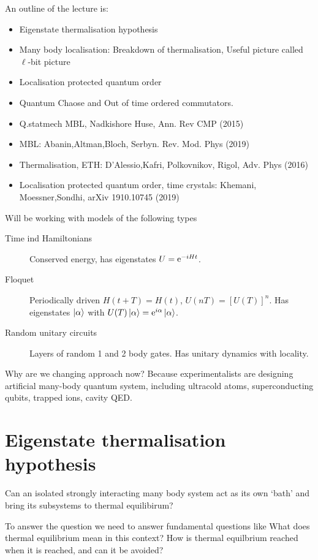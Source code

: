 \documentclass[a4paper]{article}
\begin{document}
An outline of the lecture is:
\begin{itemize}
    \item Eigenstate thermalisation hypothesis
    \item Many body localisation: Breakdown of thermalisation, Useful picture
        called $\ell$-bit picture
    \item Localisation protected quantum order
    \item Quantum Chaose and Out of time ordered commutators.
\end{itemize}
\begin{itemize}
    \item Q.statmech MBL, Nadkishore Huse, Ann. Rev CMP (2015)
    \item MBL: Abanin,Altman,Bloch, Serbyn. Rev. Mod. Phys (2019)
    \item Thermalisation, ETH: D'Alessio,Kafri, Polkovnikov, Rigol, Adv. Phys (2016)
    \item Localisation protected quantum order, time crystals: Khemani, Moessner,Sondhi,
arXiv 1910.10745 (2019)
\end{itemize}
\begin{definition}
    Will be working with models of the following types 
    \begin{description}
        \item[Time ind Hamiltonians] Conserved energy, has eigenstates $U=\mathrm{e}^{-i
            Ht}$.
        \item[Floquet] Periodically driven $H(t+T)=H(t)$,
            $U(nT)=\left[U(T)\right]^n$. Has eigenstates $\ket{\alpha}$ with
            $U(T)\ket{\alpha}=\mathrm{e}^{i\alpha}\ket{\alpha}$.
        \item[Random unitary circuits] Layers of random 1 and 2 body gates. Has
            unitary dynamics with locality.
    \end{description}
\end{definition}

Why are we changing approach now? Because experimentalists are designing
artificial many-body quantum system, including ultracold atoms, superconducting
qubits, trapped ions, cavity QED. 

\section{Eigenstate thermalisation hypothesis}
\begin{definition}
    Can an isolated strongly interacting many body system act as its own `bath'
    and bring its subsystems to thermal equilibirum?
\end{definition}
To answer the question we need to answer fundamental questions like
What does thermal equilibrium mean in this context?
How is thermal equilbrium reached when it is reached, and can it be avoided?
\end{document}
